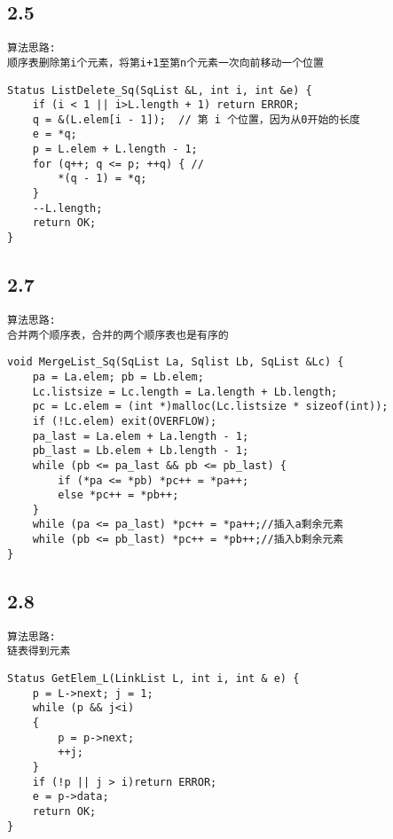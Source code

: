 \subsection{2.5}
\begin{lstlisting}[basicstyle=\small\ttfamily, caption={}, numbers=none]
算法思路:
顺序表删除第i个元素，将第i+1至第n个元素一次向前移动一个位置
\end{lstlisting}
\begin{lstlisting}[basicstyle=\small\ttfamily, caption={}, numbers=none]
Status ListDelete_Sq(SqList &L, int i, int &e) {
	if (i < 1 || i>L.length + 1) return ERROR;
	q = &(L.elem[i - 1]);  // 第 i 个位置，因为从0开始的长度
	e = *q;
	p = L.elem + L.length - 1;
	for (q++; q <= p; ++q) { //
		*(q - 1) = *q;
	}
	--L.length;
	return OK;
}

\end{lstlisting}

\subsection{2.7}
\begin{lstlisting}[basicstyle=\small\ttfamily, caption={}, numbers=none]
算法思路:
合并两个顺序表，合并的两个顺序表也是有序的
\end{lstlisting}
\begin{lstlisting}[basicstyle=\small\ttfamily, caption={}, numbers=none]
void MergeList_Sq(SqList La, Sqlist Lb, SqList &Lc) {
	pa = La.elem; pb = Lb.elem;
	Lc.listsize = Lc.length = La.length + Lb.length;
	pc = Lc.elem = (int *)malloc(Lc.listsize * sizeof(int));
	if (!Lc.elem) exit(OVERFLOW);
	pa_last = La.elem + La.length - 1;
	pb_last = Lb.elem + Lb.length - 1;
	while (pb <= pa_last && pb <= pb_last) {
		if (*pa <= *pb) *pc++ = *pa++;
		else *pc++ = *pb++;
	}
	while (pa <= pa_last) *pc++ = *pa++;//插入a剩余元素
	while (pb <= pb_last) *pc++ = *pb++;//插入b剩余元素
}
\end{lstlisting}

\subsection{2.8}
\begin{lstlisting}[basicstyle=\small\ttfamily, caption={}, numbers=none]
算法思路:
链表得到元素
\end{lstlisting}
\begin{lstlisting}[basicstyle=\small\ttfamily, caption={}, numbers=none]
Status GetElem_L(LinkList L, int i, int & e) {
	p = L->next; j = 1;
	while (p && j<i)
	{
		p = p->next;
		++j;
	}
	if (!p || j > i)return ERROR;
	e = p->data;
	return OK;
}
\end{lstlisting}


